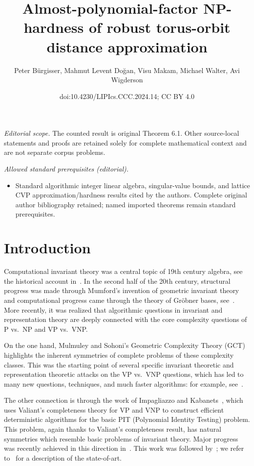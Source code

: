 \documentclass[10pt,a4paper]{article}
\title{Almost-polynomial-factor NP-hardness of robust torus-orbit distance approximation}
\author{Peter Bürgisser, Mahmut Levent Doğan, Visu Makam, Michael Walter, Avi Wigderson}
\date{doi:10.4230/LIPIcs.CCC.2024.14; CC BY 4.0}
\theoremstyle{definition}
\numberwithin{equation}{section}
\begin{document}
\maketitle
\noindent\textit{Editorial scope.} The counted result is original Theorem 6.1. Other source-local statements and proofs are retained solely for complete mathematical context and are not separate corpus problems.\par\medskip
\noindent\textit{Allowed standard prerequisites (editorial).}\begin{itemize}
\item Standard algorithmic integer linear algebra, singular-value bounds, and lattice CVP approximation/hardness results cited by the authors. Complete original author bibliography retained; named imported theorems remain standard prerequisites.
\end{itemize}\medskip
\section{Introduction}
\label{sec:intro}

Computational invariant theory was a central topic of 19th century algebra,
see the historical account in~\cite{kung-rota:84}.
In the second half of the 20th century, structural progress was made through Mumford's invention
of geometric invariant theory ~\cite{MFK:94} and computational progress came through the theory of Gr\"{o}bner bases, see~\cite{Sturmfels}.
More recently, it was realized that algorithmic questions in invariant and representation theory
are deeply connected with the core complexity questions of P vs.~NP  and VP vs.~VNP.

On the one hand,
Mulmuley and Sohoni's Geometric Complexity Theory (GCT)~\cite{mulmuley2001geometric}
highlights the inherent symmetries of complete problems of these complexity classes.
This was the starting point of several specific invariant theoretic and
representation theoretic attacks on the VP vs.~VNP questions, which has led
to many new questions, techniques, and much faster algorithms:
for example, see~\cite{GCTV,FS,BCMW:17,MW19}.

The other connection is through
the work of Impagliazzo and Kabanets~\cite{KI04},
which uses Valiant's completeness theory for VP and VNP
to construct efficient deterministic algorithms
for the basic PIT (Polynomial Identity Testing) problem.
This problem, again thanks to Valiant's completeness result, has natural symmetries
which resemble basic problems of invariant theory.
Major progress was recently achieved in this direction in~\cite{Gur04,GGOW16,IQS,IQS2,DM-poly}.
This work was followed by~\cite{DM-oc, hamada-hirai, ivanyos-qiao,GGOW:20,BGOWW,BFGOWW,BLNW:20,BFGOWW2};
we refer to~\cite{BFGOWW2} for a description of the state-of-art.
\end{document}
